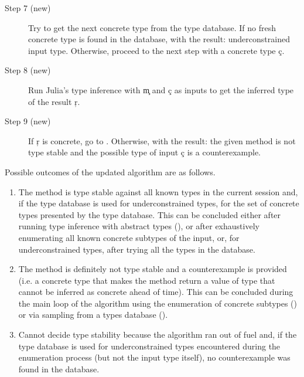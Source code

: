 \begin{description}
  \item[Step 7 (new)]
    Try to get the next concrete type from the type database.
    If no fresh concrete type is found in the database,  with
    the result: underconstrained input type.
    Otherwise, proceed to the next step with a concrete type \c c.
  \item[Step 8 (new)]
    Run Julia’s type inference with \c m and \c c as
    inputs to get the inferred type of the result \c r.
  \item[Step 9 (new)]
    If \c r  is concrete, go to . Otherwise, 
    with the result: the given method is not type stable and the possible type
    of input \c c is a counterexample.
\end{description}

Possible outcomes of the updated algorithm are as follows.
\begin{enumerate}

  \item The method is type stable against all known types in the current session
  and, if the type database is used for underconstrained types,
  for the set of concrete types presented by the type database. 
  This can be concluded either after
  running type inference with abstract types
  (), or after exhaustively enumerating all
  known concrete subtypes of the input, or,
  for underconstrained types, after trying all the types in the database.

  \item The method is definitely not type stable and a counterexample is provided
  (i.e. a
  concrete type that makes the method return a value of type that cannot be
  inferred as concrete ahead of time). This can be concluded during the main
  loop of the algorithm using the enumeration of concrete subtypes
  () or via
  sampling from a types database ().

  \item
  Cannot decide type stability because the algorithm ran out of fuel and,
  if the type database is used for underconstrained types encountered during
  the enumeration process (but not the input type itself), no
  counterexample was found in the database. %
\end{enumerate}



